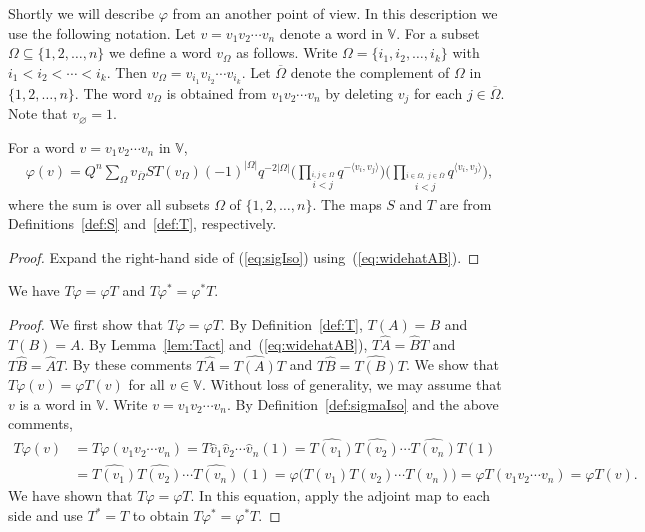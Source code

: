 Shortly we will describe $\varphi$ from an another point of view. In this description we use the following notation. Let $v=v_1v_2\cdots v_n$ denote a word in $\mathbb V$. For a subset $\Omega \subseteq \lbrace 1,2,\ldots, n\rbrace$ we define a word $v_\Omega$ as follows. Write $\Omega = \lbrace i_1,i_2,\ldots, i_k\rbrace $ with $i_1 < i_2 < \cdots < i_k$. Then $v_\Omega = v_{i_1} v_{i_2} \cdots v_{i_k}$. Let $\overline \Omega$ denote the complement of $\Omega$ in $\lbrace 1,2,\ldots, n\rbrace$.
The word $v_{\Omega}$ is obtained from $v_1v_2\cdots v_n$ by deleting $v_j$ for each $j \in \overline \Omega$. Note that $v_\varnothing = 1$.

\begin{Lemma} For a word $v=v_1v_2\cdots v_n$ in $\mathbb V$,
\begin{gather*}
\varphi(v) = Q^n \sum_{\Omega}
v_{\overline \Omega} ST(v_\Omega) (-1)^{|\Omega|} q^{-2|\Omega|}
\Biggl(
\prod_{\stackrel{i,j\in \Omega}{i<j}} q^{-\langle v_i,v_j\rangle}
\Biggr)
\Biggl(
\prod_{\stackrel{i\in \Omega, \;j\in \overline \Omega}
{i<j}} q^{\langle v_i,v_j\rangle}
\Biggr),
\end{gather*}
where the sum is over all subsets $\Omega $ of $\lbrace 1,2,\ldots, n\rbrace$. The maps $S$ and $T$ are from
Definitions~{\rm \ref{def:S}} and~{\rm \ref{def:T}}, respectively.
\end{Lemma}

\begin{proof} Expand the right-hand side of (\ref{eq:sigIso}) using~(\ref{eq:widehatAB}).
\end{proof}

\begin{Lemma}\label{lem:TT} We have $ T \varphi = \varphi T$ and $ T \varphi^* = \varphi^* T$.
\end{Lemma}
\begin{proof}We first show that $ T \varphi = \varphi T$. By Definition~\ref{def:T}, $T(A)=B$ and $T(B)=A$.
By Lemma~\ref{lem:Tact} and~(\ref{eq:widehatAB}), $T \widehat A = \widehat B T$ and $T \widehat B = \widehat A T$. By these comments $T \widehat A = \widehat {T(A)} T$ and $T \widehat B = \widehat {T(B)} T$.
We show that $ T \varphi (v) = \varphi T (v)$ for all $v \in \mathbb V$. Without loss of generality,
we may assume that $v$ is a word in $\mathbb V$. Write $v=v_1v_2\cdots v_n$. By Definition~\ref{def:sigmaIso} and the above comments,
\begin{align*}
T \varphi (v) &= T \varphi (v_1v_2\cdots v_n) =T \widehat v_1 \widehat v_2\cdots \widehat v_n (1)=
 \widehat {T(v_1)} \widehat {T(v_2)}\cdots \widehat {T(v_n)} T (1) \\
& = \widehat {T(v_1)} \widehat {T(v_2)}\cdots \widehat {T(v_n)} (1)=\varphi \bigl(T(v_1) T(v_2)\cdots T(v_n)\bigr)=\varphi T (v_1v_2\cdots v_n) =\varphi T (v).
\end{align*}
We have shown that $ T \varphi = \varphi T$. In this equation, apply the adjoint map to each side and
use $T^*=T$ to obtain $ T \varphi^* = \varphi^* T$.
\end{proof}

